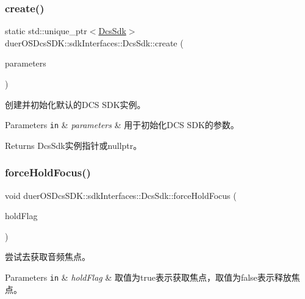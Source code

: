 \subsubsection{\texorpdfstring{create()}{create()}}
{\footnotesize\ttfamily static std\+::unique\+\_\+ptr$<$\hyperlink{classduerOSDcsSDK_1_1sdkInterfaces_1_1DcsSdk}{Dcs\+Sdk}$>$ duer\+O\+S\+Dcs\+S\+D\+K\+::sdk\+Interfaces\+::\+Dcs\+Sdk\+::create (\begin{DoxyParamCaption}\item[{\hyperlink{structduerOSDcsSDK_1_1sdkInterfaces_1_1DcsSdkParameters}{Dcs\+Sdk\+Parameters} \&}]{parameters }\end{DoxyParamCaption})\hspace{0.3cm}{\ttfamily [static]}}



创建并初始化默认的\+D\+CS S\+D\+K实例。 


\begin{DoxyParams}[1]{Parameters}
\mbox{\tt in}  & {\em parameters} & 用于初始化\+D\+CS S\+D\+K的参数。 \\
\hline
\end{DoxyParams}
\begin{DoxyReturn}{Returns}
Dcs\+Sdk实例指针或nullptr。 
\end{DoxyReturn}
\mbox{\label{classduerOSDcsSDK_1_1sdkInterfaces_1_1DcsSdk_aa9aba3850ac50a1328290fa93976bf1c}} 
\subsubsection{\texorpdfstring{force\+Hold\+Focus()}{forceHoldFocus()}}
{\footnotesize\ttfamily void duer\+O\+S\+Dcs\+S\+D\+K\+::sdk\+Interfaces\+::\+Dcs\+Sdk\+::force\+Hold\+Focus (\begin{DoxyParamCaption}\item[{bool}]{hold\+Flag }\end{DoxyParamCaption})}



尝试去获取音频焦点。 


\begin{DoxyParams}[1]{Parameters}
\mbox{\tt in}  & {\em hold\+Flag} & 取值为true表示获取焦点，取值为false表示释放焦点。 \\
\hline
\end{DoxyParams}
\mbox{\label{classduerOSDcsSDK_1_1sdkInterfaces_1_1DcsSdk_ae5e3764fd3aeb840e70c01bbfc2d08b7}} 
